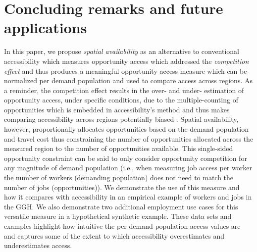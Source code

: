\documentclass[]{elsarticle} %
\begin{document}
\hypertarget{concluding-remarks-and-future-applications}{%
\section{Concluding remarks and future
applications}\label{concluding-remarks-and-future-applications}}

In this paper, we propose \emph{spatial availability} as an alternative
to conventional accessibility which measures opportunity access which
addressed the \emph{competition effect} and thus produces a meaningful
opportunity access measure which can be normalized per demand population
and used to compare access across regions. As a reminder, the
competition effect results in the over- and under- estimation of
opportunity access, under specific conditions, due to the
multiple-counting of opportunities which is embedded in accessibility's
method and thus makes comparing accessibility across regions potentially
biased . Spatial availability, however, proportionally allocates
opportunities based on the demand population and travel cost thus
constraining the number of opportunities allocated across the measured
region to the number of opportunities available. This single-sided
opportunity constraint can be said to only consider opportunity
competition for any magnitude of demand population (i.e., when measuring
job access per worker the number of workers (demanding population) does
not need to match the number of jobs (opportunities)). We demonstrate
the use of this measure and how it compares with accessibility in an
empirical example of workers and jobs in the GGH. We also demonstrate
two additional employment use cases for this versatile measure in a
hypothetical synthetic example. These data sets and examples highlight
how intuitive the per demand population access values are and captures
some of the extent to which accessibility overestimates and
underestimates access.
\end{document}
